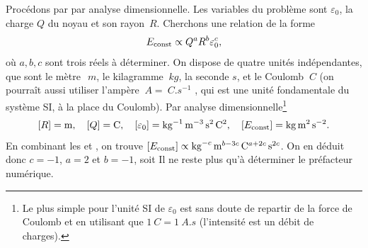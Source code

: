 \documentclass[12pt,fancy]{cours}
\begin{document}

Procédons par
par analyse dimensionnelle. Les variables du problème sont $\varepsilon_0$, la charge $Q$ du noyau et son rayon~$R$. Cherchons une relation de la forme
\begin{equation}\label{eq:homog}
E_{\rm{const}}\propto Q^{a}R^{b}\varepsilon_0^{c},
\end{equation}
où $a,b,c$ sont trois réels à déterminer. On dispose de quatre unités indépendantes, que sont le mètre~$\SI{}{m}$, le kilagramme $\SI{}{kg}$, la seconde $s$, et le Coulomb $
\SI{}{C}$ (on pourraît aussi utiliser l’ampère $\SI{}{A}=\SI{}{C.s^{-1}}$ , qui est une unité fondamentale du système SI, à la place du Coulomb). Par analyse dimensionnelle\footnote{Le plus simple pour l'unité SI de $\varepsilon_0$ est sans doute de repartir de la force de Coulomb et en utilisant que $\SI{1}{C}=\SI{1}{A.s}$ (l'intensité est un débit de charges).}
\begin{equation}\label{eq:dim}
[R]=\SI{}{m}, \quad
[Q]=\SI{}{C}, \quad
[\varepsilon_0]=\SI{}{kg^{-1}.m^{-3}.s^{2}.C^2}, \quad
[E_{\rm{const}}]=\SI{}{kg.m^{2}.s^{-2}}.
   \end{equation}
En combinant les  et , on trouve $[E_{\rm{const}}] \propto \SI{}{kg^{-c}.m^{b-3c}.C^{a+2c}.s^{2c}}$. On en déduit donc $c=-1$, $a=2$ et $b=-1$, soit
Il ne reste plus qu'à déterminer le préfacteur numérique.
\end{document}
